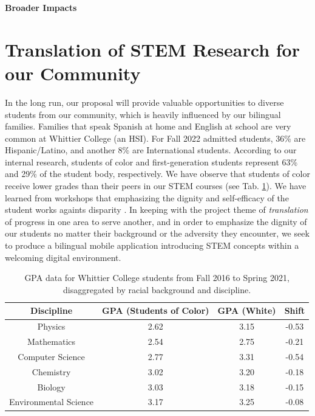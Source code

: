 \documentclass[11pt]{amsart}
\begin{document}
\linespacing
\centerline{\bf \Large Broader Impacts}
\linespacing

\section{Translation of STEM Research for our Community}
\label{sec:broad}

In the long run, our proposal will provide valuable opportunities to diverse students from our community, which is heavily influenced by our bilingual families.  Families that speak Spanish at home and English at school are very common at Whittier College (an HSI).  For Fall 2022 admitted students, 36\% are Hispanic/Latino, and another 8\% are International students.  According to our internal research, students of color and first-generation students represent 63\% and 29\% of the student body, respectively.  We have observe that students of color receive lower grades than their peers in our STEM courses (see Tab. \ref{tab:grades}).  We have learned from workshops that emphasizing the dignity and self-efficacy of the student works againts disparity \cite{cottrell1,cottrell2}.  In keeping with the project theme of \textit{translation} of progress in one area to serve another, and in order to emphasize the dignity of our students no matter their background or the adversity they encounter, we seek to produce a bilingual mobile application introducing STEM concepts within a welcoming digital environment. 

\begin{table}
\centering
\begin{tabular}{c c c c}
Discipline & GPA (Students of Color) & GPA (White) & Shift \\ \hline
Physics & 2.62 & 3.15 & -0.53 \\
Mathematics & 2.54 & 2.75 & -0.21 \\
Computer Science & 2.77 & 3.31 & -0.54 \\
Chemistry & 3.02 & 3.20 & -0.18 \\
Biology & 3.03 & 3.18 & -0.15 \\
Environmental Science & 3.17 & 3.25 & -0.08 \\
\end{tabular}
\caption{\label{tab:grades} GPA data for Whittier College students from Fall 2016 to Spring 2021, disaggregated by racial background and discipline.}
\vspace{-0.5cm}
\end{table}
\end{document}
